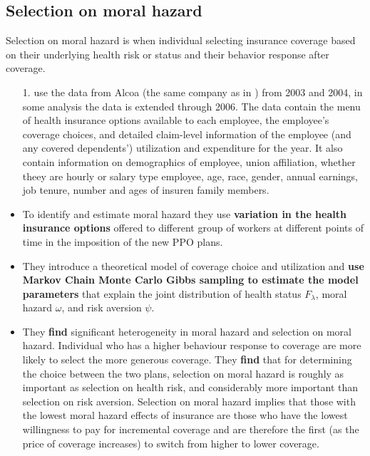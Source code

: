 \documentclass{article}
\newcommand{\bib}{references.bib}
\begin{document}
\subsection*{Selection on moral hazard}
Selection on moral hazard is when individual selecting insurance coverage based on their underlying health risk or status and their behavior response after coverage.

\begin{itemize}
    \item[1.] \textbf{\cite{einav2013selection}} use the data from Alcoa (the same company as in \cite{einav2010estimating}) from 2003 and 2004, in some analysis the data is extended through 2006. The data contain the menu of health insurance options available to each employee, the employee's coverage choices, and detailed claim-level information of the employee (and any covered dependents') utilization and expenditure for the year. It also contain information on demographics of employee, union affiliation, whether theey are hourly or salary type employee, age, race, gender, annual earnings, job tenure, number and ages of insuren family members. 
    \item To identify and estimate moral hazard they use \textbf{variation in the health insurance options} offered to different group of workers at different points of time in the imposition of the new PPO plans. 
    \item They introduce a theoretical model of coverage choice and utilization and \textbf{use Markov Chain Monte Carlo Gibbs sampling to estimate the model parameters} that explain the joint distribution of health status $F_\lambda$, moral hazard $\omega$, and risk aversion $\psi$. 
    \item They \textbf{find} significant heterogeneity in moral hazard and selection on moral hazard. Individual who has a higher behaviour response to coverage are more likely to select the more generous coverage. They \textbf{find} that for determining the choice between the two plans, selection on moral hazard is roughly as important as selection on health risk, and considerably more important than selection on risk aversion. Selection on moral hazard implies that those with the lowest moral hazard effects of insurance are those who have the lowest willingness to pay for incremental coverage and are therefore the first (as the price of coverage increases) to switch from higher to lower coverage.
\end{itemize}


\end{document}
